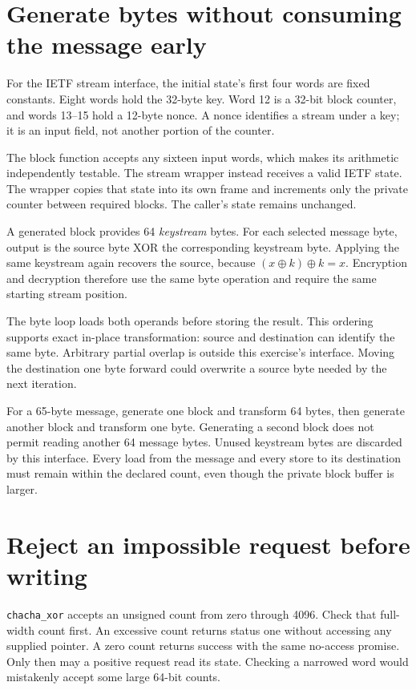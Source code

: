\section{Generate bytes without consuming the message early}

For the IETF stream interface, the initial state's first four words are fixed
constants. Eight words hold the 32-byte key. Word 12 is a 32-bit block counter,
and words 13--15 hold a 12-byte nonce. A nonce identifies a stream under a key;
it is an input field, not another portion of the counter.

The block function accepts any sixteen input words, which makes its arithmetic
independently testable. The stream wrapper instead receives a valid IETF state.
The wrapper copies that state into its own frame and increments only the private
counter between required blocks. The caller's state remains unchanged.

A generated block provides 64 \emph{keystream} bytes. For each selected message
byte, output is the source byte XOR the corresponding keystream byte. Applying
the same keystream again recovers the source, because $(x\mathbin{\oplus}k)
  \mathbin{\oplus}k=x$. Encryption and decryption therefore use the same byte
operation and require the same starting stream position.

The byte loop loads both operands before storing the result. This ordering
supports exact in-place transformation: source and destination can identify
the same byte. Arbitrary partial overlap is outside this exercise's interface.
Moving the destination one byte forward could overwrite a source byte needed
by the next iteration.

For a 65-byte message, generate one block and transform 64 bytes, then generate
another block and transform one byte. Generating a second block does not permit
reading another 64 message bytes. Unused keystream bytes are discarded by this
interface. Every load from the message and every store to its destination must
remain within the declared count, even though the private block buffer is larger.

\section{Reject an impossible request before writing}

\texttt{chacha\_xor} accepts an unsigned count from zero through 4096.
Check that full-width count first. An excessive count returns status one
without accessing any supplied pointer. A zero count returns success with the
same no-access promise. Only then may a positive request read its state.
Checking a narrowed word would mistakenly accept some large 64-bit counts.

